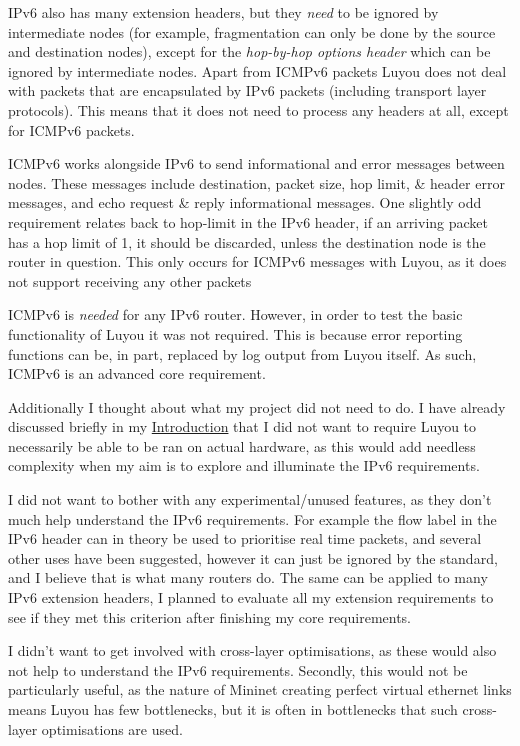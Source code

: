 \documentclass[12pt,a4paper,twoside,openright]{report}
\begin{document}
IPv6 also has many extension headers, but they \textit{need} to be ignored by intermediate nodes (for example, fragmentation can only be done by the source and destination nodes), except for the \textit{hop-by-hop options header} which can be ignored by intermediate nodes. Apart from ICMPv6 packets Luyou does not deal with packets that are encapsulated by IPv6 packets (including transport layer protocols).  This means that it does not need to process any headers at all, except for ICMPv6 packets.

\bigskip

ICMPv6 works alongside IPv6 to send informational and error messages between nodes.  These messages include destination, packet size, hop limit, \& header error messages, and echo request \& reply informational messages. One slightly odd requirement relates back to hop-limit in the IPv6 header, if an arriving packet has a hop limit of 1, it should be discarded, unless the destination node is the router in question.  This only occurs for ICMPv6 messages with Luyou, as it does not support receiving any other packets

ICMPv6 is \textit{needed} for any IPv6 router.  However, in order to test the basic functionality of Luyou it was not required. This is because error reporting functions can be, in part, replaced by log output from Luyou itself. As such, ICMPv6 is an advanced core requirement.

\bigskip

Additionally I thought about what my project did not need to do. I have already discussed briefly in my \hyperref[chap::introduction]{Introduction} that I did not want to require Luyou to necessarily be able to be ran on actual hardware, as this would add needless complexity when my aim is to explore and illuminate the IPv6 requirements. 

I did not want to bother with any experimental/unused features, as they don't much help understand the IPv6 requirements. For example the flow label in the IPv6 header can in theory be used to prioritise real time packets, and several other uses have been suggested, however it can just be ignored by the standard, and I believe that is what many routers do.  The same can be applied to many IPv6 extension headers, I planned to evaluate all my extension requirements to see if they met this criterion after finishing my core requirements.

I didn't want to get involved with cross-layer optimisations, as these would also not help to understand the IPv6 requirements.  Secondly, this would not be particularly useful, as the nature of Mininet creating perfect virtual ethernet links means Luyou has few bottlenecks, but it is often in bottlenecks that such cross-layer optimisations are used.
\end{document}
